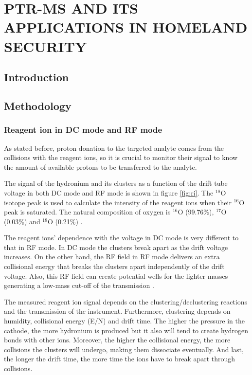 \chapter{%
PTR-MS AND ITS APPLICATIONS IN HOMELAND SECURITY%
}
 
 
\section{Introduction}
\section{Methodology}
 
\subsection{Reagent ion in DC mode and RF mode}
As stated before, proton donation to the targeted analyte comes from the collisions with the reagent ions, so it is crucial to monitor their signal to know the amount of available protons to be transferred to the analyte.

The signal of the hydronium and its clusters as a function of the drift tube voltage in both DC mode and RF mode is shown in figure \ref{fig:ri}. The $^{18}$O isotope peak is used to calculate the intensity of the reagent ions when their $^{16}$O peak is saturated. The natural composition of oxygen is $^{16}$O (99.76\%), $^{17}$O (0.03\%) and $^{18}$O (0.21\%) \cite{nistoxygen}.

The reagent ions' dependence with the voltage in DC mode is very different to that in RF mode. In DC mode the clusters break apart as the drift voltage increases. On the other hand, the RF field in RF mode delivers an extra collisional energy that breaks the clusters apart independently of the drift voltage. Also, this RF field can create potential wells for the lighter masses generating a low-mass cut-off of the transmission \cite{Chung123}.

The measured reagent ion signal depends on the clustering/declustering reactions and the transmission of the instrument. Furthermore, clustering depends on humidity, collisional energy (E/N) and drift time. The higher the pressure in the cathode, the more hydronium is produced but it also will tend to create hydrogen bonds with other ions. Moreover, the higher the collisional energy, the more collisions the clusters will undergo, making them dissociate eventually. And last, the longer the drift time, the more time the ions have to break apart through collisions.

